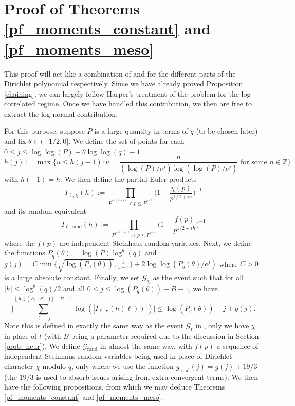 \documentclass[10pt,a4paper]{amsart}
\numberwithin{equation}{section}
\begin{document}
\section{Proof of Theorems \ref{pf_moments_constant} and \ref{pf_moments_meso}} \label{pfm_proof}
This proof will act like a combination of \cite{ah24} and \cite{harper2019partition} for the different parts of the Dirichlet polynomial respectively. Since we have already proved Proposition \ref{chaining}, we can largely follow Harper's treatment of the problem for the log-correlated regime. Once we have handled this contribution, we then are free to extract the log-normal contribution. \par
For this purpose, suppose $P$ is a large quantity in terms of $q$ (to be chosen later) and fix $\theta \in (-1/2,0]$. We define the set of points for each $0 \leq j \leq \log\log(P)+\theta\log\log(q)-1$
\begin{equation}
    h(j) := \max\big\{u \leq h(j-1):u=\frac{n}{(\log(P)/e^j)\log(\log(P)/e^j)} \text{ for some } n \in \mathbb{Z}\big\} \label{discrete_h}
\end{equation}
with $h(-1) = h$. We then define the partial Euler products
\begin{equation}
    I_{\ell,\chi}(h) := \prod_{P^{e^{-(\ell+1)}} < p \leq P^{e^{-\ell}}}\big(1-\frac{\chi(p)}{p^{1/2+ih}}\big)^{-1} \label{char_increment}
\end{equation}
and its random equivalent
\begin{equation}
    I_{\ell,\text{rand}}(h) :=\prod_{P^{e^{-(\ell+1)}} < p \leq P^{e^{-\ell}}}\big(1-\frac{f(p)}{p^{1/2+ih}}\big)^{-1} \label{random_increment}
\end{equation}
where the $f(p)$ are independent Steinhaus random variables. Next, we define the functions $P_q(\theta) = \log(P)\log^\theta(q)$ and $g(j) = C\min\{\sqrt{\log(P_q(\theta))},\frac{1}{1-r}\} + 2\log\log(P_q(\theta)/e^j)$ where $C>0$ is a large absolute constant. Finally, we set $\mathcal{G}_\chi$ as the event such that for all $|h| \leq \log^\theta(q)/2$ and all $0 \leq j \leq \log(P_q(\theta)) - B -1$, we have
$$\big|\sum_{\ell=j}^{\lfloor\log(P_q(\theta))\rfloor-B-1}\log(|I_{\ell,\chi}(h(\ell))|)\big|\leq \log(P_q(\theta)) - j +g(j).$$
Note this is defined in exactly the same way as the event $\mathcal{G}_t$ in \cite{harper2019partition}, only we have $\chi$ in place of $t$ (with $B$ being a parameter required due to the discussion in Section \ref{prob_heur}). We define $\mathcal{G}_{\text{rand}}$ in almost the same way, with $f(p)$ a sequence of independent Steinhaus random variables being used in place of Dirichlet character $\chi$ modulo $q$, only where we use the function $g_{\text{rand}}(j) = g(j) + 19/3$ (the $19/3$ is used to absorb issues arising from extra convergent terms). We then have the following propositions, from which we may deduce Theorems \ref{pf_moments_constant} and \ref{pf_moments_meso}.
\end{document}
